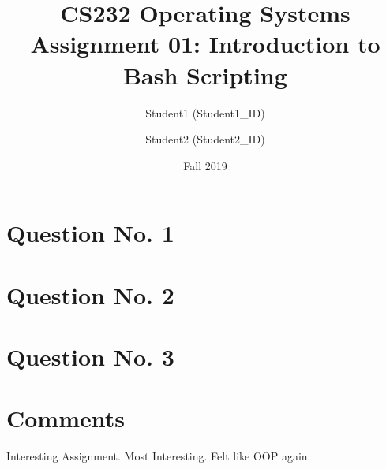 \documentclass[a4paper]{article}
\begin{document}
\title{CS232 Operating Systems \\ Assignment 01: Introduction to Bash Scripting}
\author{Student1 (Student1\_ID) \and Student2 (Student2\_ID)}
\date{Fall 2019}
\maketitle


\section {Question No. 1}

\section {Question No. 2}




\section {Question No. 3}



\section {Comments}

Interesting Assignment. Most Interesting. Felt like OOP again. 
\end{document}
